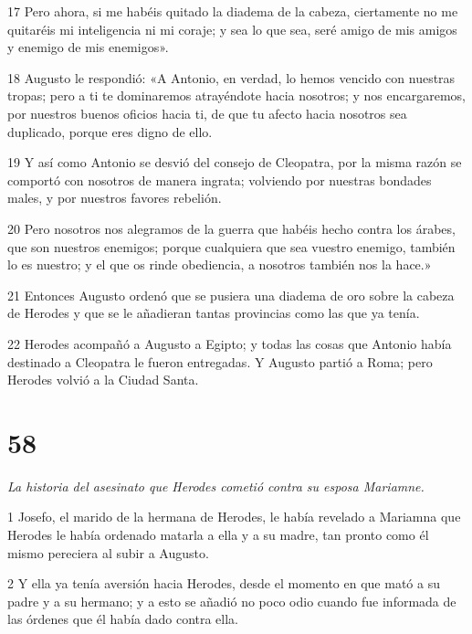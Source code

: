 \par 17 Pero ahora, si me habéis quitado la diadema de la cabeza, ciertamente no me quitaréis mi inteligencia ni mi coraje; y sea lo que sea, seré amigo de mis amigos y enemigo de mis enemigos».

\par 18 Augusto le respondió: «A Antonio, en verdad, lo hemos vencido con nuestras tropas; pero a ti te dominaremos atrayéndote hacia nosotros; y nos encargaremos, por nuestros buenos oficios hacia ti, de que tu afecto hacia nosotros sea duplicado, porque eres digno de ello.

\par 19 Y así como Antonio se desvió del consejo de Cleopatra, por la misma razón se comportó con nosotros de manera ingrata; volviendo por nuestras bondades males, y por nuestros favores rebelión.

\par 20 Pero nosotros nos alegramos de la guerra que habéis hecho contra los árabes, que son nuestros enemigos; porque cualquiera que sea vuestro enemigo, también lo es nuestro; y el que os rinde obediencia, a nosotros también nos la hace.»

\par 21 Entonces Augusto ordenó que se pusiera una diadema de oro sobre la cabeza de Herodes y que se le añadieran tantas provincias como las que ya tenía.

\par 22 Herodes acompañó a Augusto a Egipto; y todas las cosas que Antonio había destinado a Cleopatra le fueron entregadas. Y Augusto partió a Roma; pero Herodes volvió a la Ciudad Santa.

\chapter{58}

\par \textit{La historia del asesinato que Herodes cometió contra su esposa Mariamne.}

\par 1 Josefo, el marido de la hermana de Herodes, le había revelado a Mariamna que Herodes le había ordenado matarla a ella y a su madre, tan pronto como él mismo pereciera al subir a Augusto.

\par 2 Y ella ya tenía aversión hacia Herodes, desde el momento en que mató a su padre y a su hermano; y a esto se añadió no poco odio cuando fue informada de las órdenes que él había dado contra ella.

